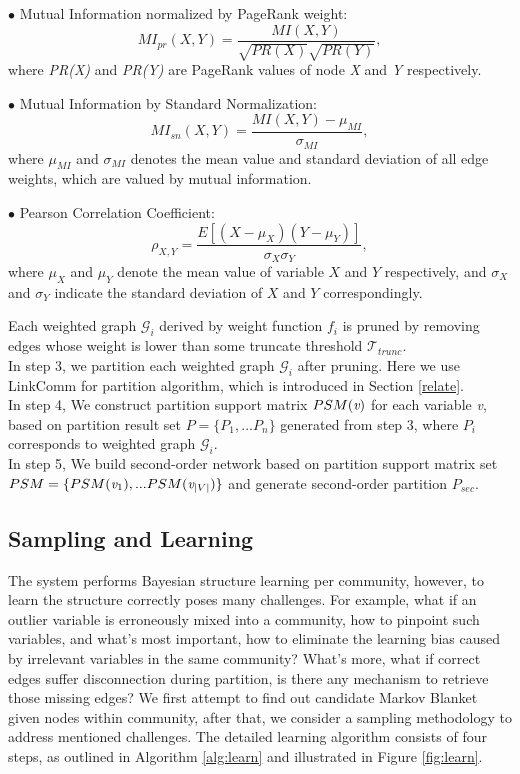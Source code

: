 $\bullet$ Mutual Information normalized by PageRank weight:
\[MI_{pr}(X,Y)=\frac{MI(X,Y)}{\sqrt{PR(X)}\sqrt{PR(Y)}},\]
where \emph{PR(X)} and \emph{PR(Y)} are PageRank values of node \emph{X} and \emph{Y} respectively.


$\bullet$ Mutual Information by Standard Normalization:
\[MI_{sn}(X,Y)=\frac{MI(X,Y)-\mu _{MI}}{\sigma _{MI}},\]
where $\mu _{MI}$ and $\sigma _{MI}$ denotes the mean value and standard deviation of all edge weights, which are valued by mutual information.

$\bullet$ Pearson Correlation Coefficient:
\[\rho_{X,Y}=\frac{E[(X-\mu_{X})(Y-\mu_{Y})]}{\sigma_{X} \sigma_{Y}},\]
where $\mu_{X}$ and $\mu_{Y}$ denote the mean value of variable $X$ and $Y$ respectively, and $\sigma_{X}$ and $\sigma_{Y}$ indicate the standard deviation of $X$ and $Y$ correspondingly.

Each weighted graph $\mathcal{G}_{i}$ derived by weight function $f_{i}$ is pruned by removing edges whose weight is lower than some truncate threshold $\mathcal {T}_{trunc}$.\\

In step 3, we partition each weighted graph $\mathcal{G}_{i}$ after pruning. Here we use LinkComm\cite{YY_LC_nature2010} for partition algorithm, which is introduced in Section \ref{relate}.\\

In step 4, We construct partition support matrix $PSM(\emph{v})$ for each variable \emph{v}, based on partition result set $P=\{P_{1},...P_{n}\}$ generated from step 3, where $P_{i}$ corresponds to weighted graph $\mathcal{G}_{i}$. \\

In step 5, We build second-order network based on partition support matrix set $PSM=\{ PSM(\emph{v}_{1}),...PSM(\emph{v}_{\left | V \right |})\}$ and generate second-order partition $P_{sec}$.

\subsection{Sampling and Learning}
\label{learn}

The \lama{} system performs Bayesian structure learning per community, however, to learn the structure correctly poses many challenges. For example, what if an outlier variable is erroneously mixed into a community, how to pinpoint such variables, and what's most important, how to eliminate the learning bias caused by irrelevant variables in the same community? What's more, what if correct edges suffer disconnection during partition, is there any mechanism to retrieve those missing edges? We first attempt to find out candidate Markov Blanket given nodes within community, after that, we consider a sampling methodology to address mentioned challenges. The detailed learning algorithm consists of four steps, as outlined in Algorithm \ref{alg:learn} and illustrated in Figure \ref{fig:learn}.\\

